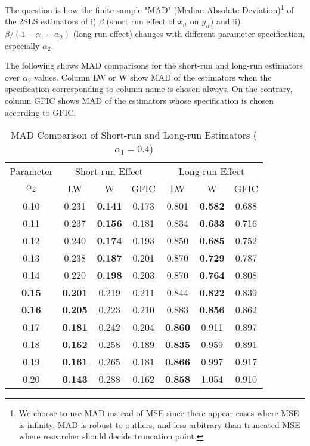 The question is how the finite sample "MAD" (Median Absolute Deviation)\footnote{We choose to use MAD instead of MSE since there appear cases where MSE is infinity. MAD is robust to outliers, and less arbitrary than truncated MSE where researcher should decide truncation point.} of the 2SLS estimators of i) $\beta$ (short run effect of $x_{it}$ on $y_{it}$) and ii) $\beta/(1-\alpha_1-\alpha_2)$ (long run effect) changes with different parameter specification, especially $\alpha_2$.  

The following shows MAD comparisons for the short-run and long-run estimators over $\alpha_2$ values. Column LW or W show MAD of the estimators when the specification corresponding to column name is chosen always. On the contrary, column GFIC shows MAD of the estimators whose specification is chosen according to GFIC.   

\begin{table}[!hpt]
\centering
\small
\begin{tabular}{  c | c c  c | c c c  }
\hline
\hline
Parameter & \multicolumn{3}{c}{Short-run Effect} & \multicolumn{3}{c}{Long-run Effect} \\
    $\alpha_2$ &      LW  &       W   &    GFIC    & LW &     W &   GFIC\\
    \hline
 0.10  &0.231&\bf{\color{blue}0.141}& 0.173& 0.801& \bf{\color{blue}0.582}& 0.688\\
  0.11 & 0.237& \bf{\color{blue}0.156}& 0.181& 0.834& \bf{\color{blue}0.633}& 0.716\\
 0.12   &0.240& \bf{\color{blue}0.174}& 0.193& 0.850& \bf{\color{blue}0.685}& 0.752\\
 0.13   &0.238& \bf{\color{blue}0.187}& 0.201& 0.870& \bf{\color{blue}0.729}& 0.787\\
 0.14 &0.220& \bf{\color{blue}0.198}& 0.203& 0.870& \bf{\color{blue}0.764}& 0.808\\
\bf{\color{red} 0.15}  & \bf{\color{blue}0.201}& 0.219& 0.211& 0.844& \bf{\color{blue}0.822}& 0.839\\
\bf{\color{red} 0.16}  & \bf{\color{blue}0.205}& 0.223& 0.210& 0.883& \bf{\color{blue}0.856}& 0.862\\
 0.17  &\bf{\color{blue}0.181}& 0.242& 0.204& \bf{\color{blue}0.860}& 0.911& 0.897\\
 0.18  & \bf{\color{blue}0.162}& 0.258& 0.189& \bf{\color{blue}0.835}& 0.959& 0.891\\
 0.19  &\bf{\color{blue}0.161}& 0.265& 0.181& \bf{\color{blue}0.866}& 0.997& 0.917\\
 0.20  &\bf{\color{blue}0.143}& 0.288& 0.162& \bf{\color{blue}0.858}& 1.054& 0.910 \\
\hline
 \hline
\end{tabular}
\vspace{0.1in}
\caption{MAD Comparison of Short-run and Long-run Estimators ($\alpha_1 = 0.4$)}
\end{table}		

